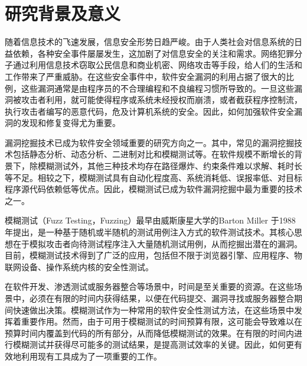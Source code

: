 \documentclass[master]{thesis-uestc}
\begin{document}
\section{研究背景及意义}

随着信息技术的飞速发展，信息安全形势日趋严峻。由于人类社会对信息系统的日益依赖，各种安全事件屡屡发生，这加剧了对信息安全的关注和需求。网络犯罪分子通过利用信息技术窃取公民信息和商业机密、网络攻击等手段，给人们的生活和工作带来了严重威胁。在这些安全事件中，软件安全漏洞的利用占据了很大的比例，这些漏洞通常是由程序员的不合理编程和不良编程习惯所导致的。一旦这些漏洞被攻击者利用，就可能使得程序或系统未经授权而崩溃，或者截获程序控制流，执行攻击者编写的恶意代码，危及计算机系统的安全。因此，如何加强软件安全漏洞的发现和修复变得尤为重要。

漏洞挖掘技术已成为软件安全领域重要的研究方向之一。其中，常见的漏洞挖掘技术包括静态分析、动态分析、二进制对比和模糊测试等。在软件规模不断增长的背景下，除模糊测试外，其他三种技术均存在路径爆炸、约束条件难以求解、耗时长等不足。相较之下，模糊测试具有自动化程度高、系统消耗低、误报率低、对目标程序源代码依赖低等优点。因此，模糊测试已成为软件漏洞挖掘中最为重要的技术之一。

模糊测试（Fuzz Testing，Fuzzing）最早由威斯康星大学的Barton Miller 于1988年提出，是一种基于随机或半随机的测试用例注入方式的软件测试技术。其核心思想在于模拟攻击者向待测试程序注入大量随机测试用例，从而挖掘出潜在的漏洞。目前，模糊测试技术得到了广泛的应用，包括但不限于浏览器引擎、应用程序、物联网设备、操作系统内核的安全性测试。

在软件开发、渗透测试或服务器整合等场景中，时间是至关重要的资源。在这些场景中，必须在有限的时间内获得结果，以便在代码提交、漏洞寻找或服务器整合期间快速做出决策。模糊测试作为一种常用的软件安全性测试方法，在这些场景中发挥着重要作用。然而，由于可用于模糊测试的时间预算有限，这可能会导致难以在预算时间内覆盖到代码的所有部分，从而降低模糊测试的效果。在有限的时间内进行模糊测试并获得尽可能多的测试结果，是提高测试效率的关键。因此，如何更有效地利用现有工具成为了一项重要的工作。
\end{document}
